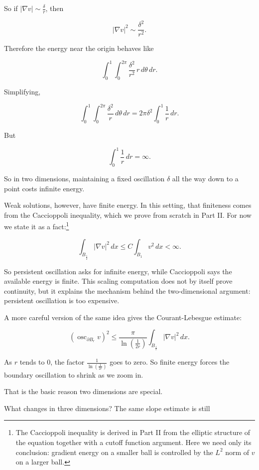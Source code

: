 \documentclass[11pt]{article}
\begin{document}
So if \(|\nabla v|\sim \frac{\delta}{r}\), then

\[
|\nabla v|^2\sim \frac{\delta^2}{r^2}.
\]

Therefore the energy near the origin behaves like

\[
\int_0^1\int_0^{2\pi}\frac{\delta^2}{r^2}\,r\,d\theta\,dr.
\]

Simplifying,

\[
\int_0^1\int_0^{2\pi}\frac{\delta^2}{r}\,d\theta\,dr
=2\pi\delta^2\int_0^1\frac{1}{r}\,dr.
\]

But

\[
\int_0^1\frac{1}{r}\,dr=\infty.
\]

So in two dimensions, maintaining a fixed oscillation \(\delta\) all the
way down to a point costs infinite energy.

Weak solutions, however, have finite energy. In this setting, that
finiteness comes from the Caccioppoli inequality, which we prove from
scratch in Part II. For now we state it as a fact:\footnote{The
  Caccioppoli inequality is derived in Part II from the elliptic
  structure of the equation together with a cutoff function argument.
  Here we need only its conclusion: gradient energy on a smaller ball is
  controlled by the \(L^2\) norm of \(v\) on a larger ball.}
\hypertarget{eq-caccioppoli}{}\label{eq-caccioppoli}

\[
\int_{B_{\frac{1}{2}}} |\nabla v|^2 \, dx \le C \int_{B_1} v^2 \, dx < \infty.
\]

So persistent oscillation asks for infinite energy, while Caccioppoli
says the available energy is finite. This scaling computation does not
by itself prove continuity, but it explains the mechanism behind the
two-dimensional argument: persistent oscillation is too expensive.

A more careful version of the same idea gives the Courant-Lebesgue
estimate: \hypertarget{eq-courant-lebesgue}{}\label{eq-courant-lebesgue}

\[
\left(\operatorname{osc}_{\partial B_r} v\right)^2 \le \frac{\pi}{\ln\!\left(\frac{1}{2r}\right)} \int_{B_{\frac{1}{2}}} |\nabla v|^2 \, dx.
\]

As \(r\) tends to \(0\), the factor
\(\frac{1}{\ln\!\left(\frac{1}{2r}\right)}\) goes to zero. So finite
energy forces the boundary oscillation to shrink as we zoom in.

That is the basic reason two dimensions are special.

What changes in three dimensions? The same slope estimate is still
\end{document}

